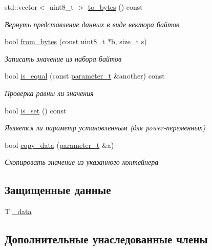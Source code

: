 \begin{DoxyCompactItemize}
std\-::vector$<$ uint8\-\_\-t $>$ \hyperlink{classLIBKMS__namespace_1_1Holder_af3568f981e9862d1cdc85404c971f8fd}{to\-\_\-bytes} () const 
\begin{DoxyCompactList}\small\item\em Вернуть представление данных в виде вектора байтов \end{DoxyCompactList}\item 
bool \hyperlink{classLIBKMS__namespace_1_1Holder_a6c9274a0d762e36bd709baff85a4c8b2}{from\-\_\-bytes} (const uint8\-\_\-t $\ast$b, size\-\_\-t s)
\begin{DoxyCompactList}\small\item\em Записать значение из набора байтов \end{DoxyCompactList}\item 
bool \hyperlink{classLIBKMS__namespace_1_1Holder_a625053bf2acde4d625d3b25635478c9f}{is\-\_\-equal} (const \hyperlink{classLIBKMS__namespace_1_1Parameter}{parameter\-\_\-t} \&another) const 
\begin{DoxyCompactList}\small\item\em Проверка равны ли значения \end{DoxyCompactList}\item 
bool \hyperlink{classLIBKMS__namespace_1_1Holder_a25d1d8c9e5659fd2a2b0980031bf7166}{is\-\_\-set} () const 
\begin{DoxyCompactList}\small\item\em Является ли параметр установленным (для power-\/переменных) \end{DoxyCompactList}\item 
bool \hyperlink{classLIBKMS__namespace_1_1Holder_a9cb55778ffef92d63b954f1e07f56d58}{copy\-\_\-data} (\hyperlink{classLIBKMS__namespace_1_1Parameter}{parameter\-\_\-t} \&a)
\begin{DoxyCompactList}\small\item\em Скопировать значение из указанного контейнера \end{DoxyCompactList}\end{DoxyCompactItemize}
\subsection*{Защищенные данные}
\begin{DoxyCompactItemize}
\item 
T \hyperlink{classLIBKMS__namespace_1_1Holder_a7a9cd1db71653a8e0f93aa57276eedc0}{\-\_\-data}
\end{DoxyCompactItemize}
\subsection*{Дополнительные унаследованные члены}


